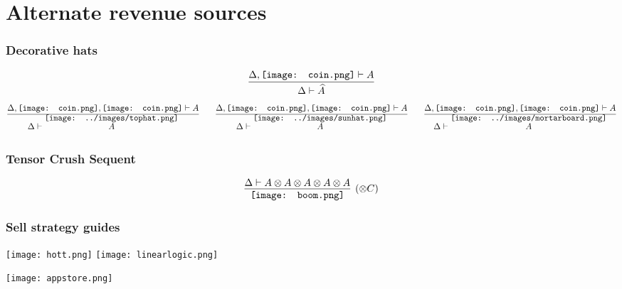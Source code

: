 \documentclass{beamer}
\newcommand{\coin}{\texttt{[image: coin.png]}}
\newcommand{\tophat}[1]{\ensuremath{\overset{\raisebox{-1.4em}[-1em]{\texttt{[image: ../images/tophat.png]}}}{#1}}}
\newcommand{\sunhat}[1]{\ensuremath{\overset{\raisebox{-1.4em}[-1em]{\texttt{[image: ../images/sunhat.png]}}}{#1}}}
\newcommand{\gradhat}[1]{\ensuremath{\overset{\raisebox{-1.4em}[-1em]{\texttt{[image: ../images/mortarboard.png]}}}{#1}}}
\begin{document}
\section{Alternate revenue sources}

\begin{frame}
\frametitle{Decorative hats}
\[\infer
  {\Delta\vdash\widehat{A}}
  {\Delta,\coin\vdash A}
\]
\pause
\[\infer
  {\Delta\vdash\tophat{A}}
  {\Delta,\coin,\coin\vdash A}
\qquad
  \infer
  {\Delta\vdash\sunhat{A}}
  {\Delta,\coin,\coin\vdash A}
\qquad
  \infer
  {\Delta\vdash\gradhat{A}}
  {\Delta,\coin,\coin\vdash A}
\]
\end{frame}

\begin{frame}
\frametitle{Tensor Crush Sequent}
\[\infer[(\otimes C)]
  {\texttt{[image: boom.png]}}
  {\Delta\vdash A\otimes A\otimes A\otimes A\otimes A}
\]
\end{frame}

\begin{frame}
\frametitle{Sell strategy guides}
\texttt{[image: hott.png]}\qquad
\texttt{[image: linearlogic.png]}
\end{frame}

\begin{frame}
\begin{center}
\texttt{[image: appstore.png]}
\end{center}
\end{frame}
\end{document}
